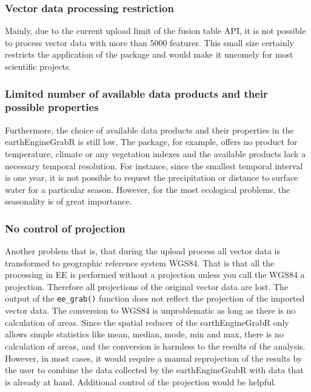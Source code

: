 \subsubsection{Vector data processing restriction}

Mainly, due to the current upload limit of the fusion table API, it is not possible to process vector data with more than 5000 features. This small size certainly restricts the application of the package and would make it uncomely for most scientific projects. 

\subsubsection{Limited number of available data products and their possible properties}

Furthermore, the choice of available data products and their properties in the earthEngineGrabR is still low. The package, for example, offers no product for temperature, climate or any vegetation indexes and the available products lack a necessary temporal resolution. For instance, since the smallest temporal interval is one year, it is not possible to request the precipitation or distance to surface water for a particular season. However, for the most ecological problems, the seasonality is of great importance.

\subsubsection{No control of projection}

Another problem that is, that during the upload process all vector data is transformed to geographic reference system WGS84. That is that all the processing in EE is performed without a projection unless you call the WGS84 a projection. Therefore all projections of the original vector data are lost. The output of the \texttt{ee\_grab()} function does not reflect the projection of the imported vector data. The conversion to WGS84 is unproblematic as long as there is no calculation of areas. Since the spatial reducer of the earthEngineGrabR only allows simple statistics like mean, median, mode, min and max, there is no calculation of areas, and the conversion is harmless to the results of the analysis. However, in most cases, it would require a manual reprojection of the results by the user to combine the data collected by the earthEngineGrabR with data that is already at hand. Additional control of the projection would be helpful.

